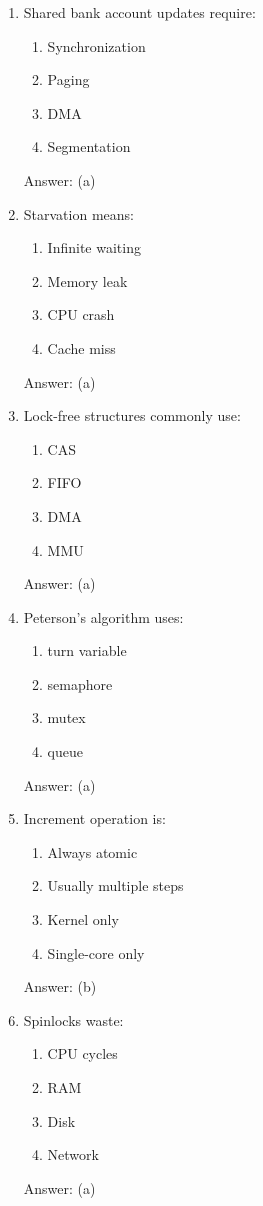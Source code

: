 \begin{enumerate}
\item Shared bank account updates require:
\begin{enumerate}[label=(\alph*)]
\item Synchronization
\item Paging
\item DMA
\item Segmentation
\end{enumerate}
Answer: (a)

\item Starvation means:
\begin{enumerate}[label=(\alph*)]
\item Infinite waiting
\item Memory leak
\item CPU crash
\item Cache miss
\end{enumerate}
Answer: (a)

\item Lock-free structures commonly use:
\begin{enumerate}[label=(\alph*)]
\item CAS
\item FIFO
\item DMA
\item MMU
\end{enumerate}
Answer: (a)

\item Peterson's algorithm uses:
\begin{enumerate}[label=(\alph*)]
\item turn variable
\item semaphore
\item mutex
\item queue
\end{enumerate}
Answer: (a)

\item Increment operation is:
\begin{enumerate}[label=(\alph*)]
\item Always atomic
\item Usually multiple steps
\item Kernel only
\item Single-core only
\end{enumerate}
Answer: (b)

\item Spinlocks waste:
\begin{enumerate}[label=(\alph*)]
\item CPU cycles
\item RAM
\item Disk
\item Network
\end{enumerate}
Answer: (a)


\end{enumerate}
